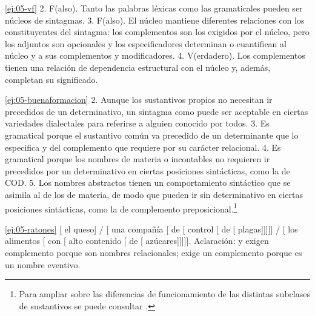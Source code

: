 \begin{solucion}{\ref{ej:05-vf}}
2. F(also). Tanto las palabras léxicas como las gramaticales pueden ser núcleos
de sintagmas. 3. F(also). El núcleo mantiene diferentes relaciones con los
constituyentes del sintagma: los complementos son los exigidos por el núcleo,
pero los adjuntos son opcionales y los especificadores determinan o cuantifican
al núcleo y a sus complementos y modificadores. 4. V(erdadero). Los complementos
tienen una relación de dependencia estructural con el núcleo y, además,
completan su significado.
\end{solucion}

\begin{solucion}{\ref{ej:05-buenaformacion}}
2. Aunque los sustantivos propios no necesitan ir precedidos de un
determinativo, un sintagma como  puede ser aceptable en ciertas
variedades dialectales para referirse a alguien conocido por todos. 3. Es
gramatical porque el sustantivo común  va precedido de un
determinante que lo especifica y del complemento que requiere por su carácter
relacional. 4. Es gramatical porque los nombres de materia o incontables no
requieren ir precedidos por un determinativo en ciertas posiciones sintácticas,
como la de COD. 5. Los nombres abstractos tienen un comportamiento sintáctico
que se asimila al de los de materia, de modo que pueden ir sin determinativo en
ciertas posiciones sintácticas, como la de complemento
preposicional.\footnote{Para ampliar sobre las diferencias de funcionamiento de
las distintas subclases de sustantivos se puede consultar
\textcite{giammatteo2009}.}
\end{solucion}

\begin{solucion}{\ref{ej:05-ratones}}
{}[ el queso] / [ una compañía
[ de [ control [
de [ plagas]]]]] / [ los
alimentos [ con [ alto
contenido [ de [ azúcares]]]]].
Aclaración:  y  exigen complemento porque son
nombres relacionales;  exige un complemento porque es un nombre
eventivo.
\end{solucion}

